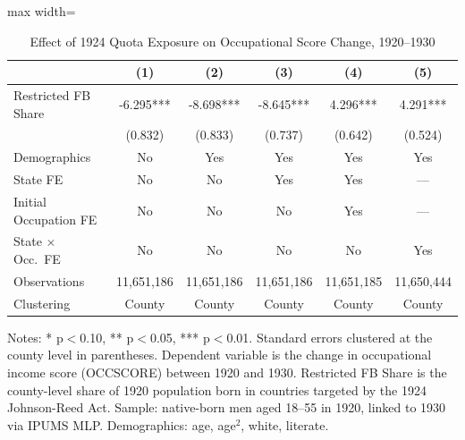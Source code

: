 \begin{table}[H]
\centering
\caption{Effect of 1924 Quota Exposure on Occupational Score Change, 1920--1930}
\begin{threeparttable}
\begin{adjustbox}{max width=\textwidth}
\begin{tabular}{lccccc}
\toprule
& (1) & (2) & (3) & (4) & (5) \\
\midrule
Restricted FB Share & -6.295*** & -8.698*** & -8.645*** & 4.296*** & 4.291*** \\
& (0.832) & (0.833) & (0.737) & (0.642) & (0.524) \\
\midrule
Demographics & No & Yes & Yes & Yes & Yes \\
State FE & No & No & Yes & Yes & --- \\
Initial Occupation FE & No & No & No & Yes & --- \\
State $\times$ Occ.\ FE & No & No & No & No & Yes \\
Observations & 11,651,186 & 11,651,186 & 11,651,186 & 11,651,185 & 11,650,444 \\
Clustering & County & County & County & County & County \\
\bottomrule
\end{tabular}
\end{adjustbox}
\begin{tablenotes}[flushleft]
\small
\item Notes: * p$<$0.10, ** p$<$0.05, *** p$<$0.01. Standard errors clustered at the county level in parentheses. Dependent variable is the change in occupational income score (OCCSCORE) between 1920 and 1930. Restricted FB Share is the county-level share of 1920 population born in countries targeted by the 1924 Johnson-Reed Act. Sample: native-born men aged 18--55 in 1920, linked to 1930 via IPUMS MLP. Demographics: age, age$^2$, white, literate.
\end{tablenotes}
\end{threeparttable}
\label{tab:main}
\end{table}
